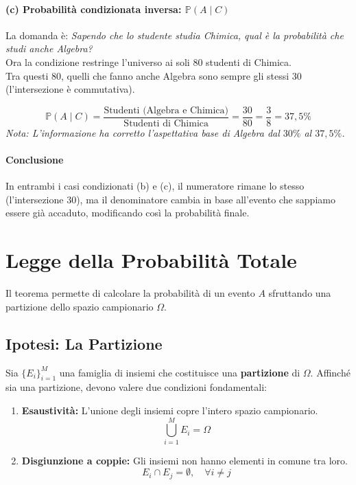 \begin{esempio}
\paragraph{(c) Probabilità condizionata inversa: $\mathbb{P}(A \mid C)$}
La domanda è: \emph{Sapendo che lo studente studia Chimica, qual è la probabilità che studi anche Algebra?}
\\Ora la condizione restringe l'universo ai soli 80 studenti di Chimica.
\\Tra questi 80, quelli che fanno anche Algebra sono sempre gli stessi 30 (l'intersezione è commutativa).

\[
\mathbb{P}(A \mid C) = \frac{\text{Studenti (Algebra e Chimica)}}{\text{Studenti di Chimica}} = \frac{30}{80} = \frac{3}{8} = 37,5\%
\]
\emph{Nota: L'informazione ha corretto l'aspettativa base di Algebra dal $30\%$ al $37,5\%$.}

\paragraph{Conclusione}
In entrambi i casi condizionati (b) e (c), il numeratore rimane lo stesso (l'intersezione $30$), ma il denominatore cambia in base all'evento che sappiamo essere già accaduto, modificando così la probabilità finale.

\end{esempio}

\section{Legge della Probabilità Totale}

Il teorema permette di calcolare la probabilità di un evento $A$ sfruttando una partizione dello spazio campionario $\Omega$.

\subsection{Ipotesi: La Partizione}

Sia $\{E_i\}_{i=1}^M$ una famiglia di insiemi che costituisce una \textbf{partizione} di $\Omega$. Affinché sia una partizione, devono valere due condizioni fondamentali:

\begin{enumerate}
    \item \textbf{Esaustività:} L'unione degli insiemi copre l'intero spazio campionario.
    \[ \bigcup_{i=1}^M E_i = \Omega \]
    
    \item \textbf{Disgiunzione a coppie:} Gli insiemi non hanno elementi in comune tra loro.
    \[ E_i \cap E_j = \emptyset, \quad \forall i \neq j \]
\end{enumerate}

